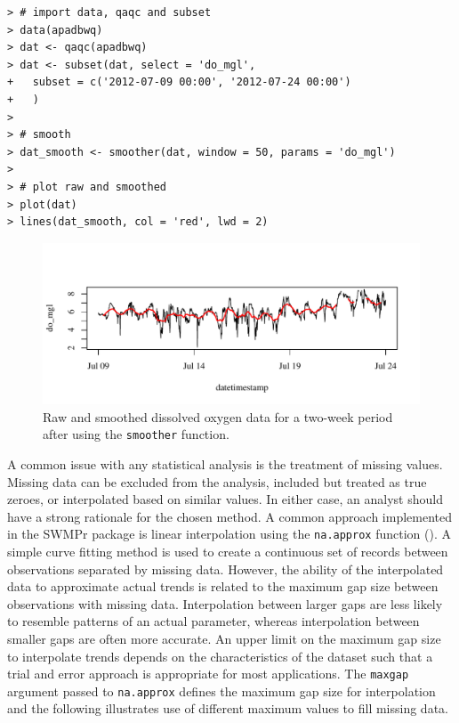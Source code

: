 \documentclass[10pt,letterpaper]{article}\usepackage[]{graphicx}\usepackage[]{color}
\makeatletter
\def\maxwidth{ %
  \ifdim\Gin@nat@width>\linewidth
    \linewidth
  \else
    \Gin@nat@width
  \fi
}
\newenvironment{kframe}{%
 \def\at@end@of@kframe{}%
 \ifinner\ifhmode%
  \def\at@end@of@kframe{\end{minipage}}%
  \begin{minipage}{\columnwidth}%
 \fi\fi%
 \def\FrameCommand##1{\hskip\@totalleftmargin \hskip-\fboxsep
 \colorbox{shadecolor}{##1}\hskip-\fboxsep
     \hskip-\linewidth \hskip-\@totalleftmargin \hskip\columnwidth}%
 \MakeFramed {\advance\hsize-\width
   \@totalleftmargin\z@ \linewidth\hsize
   \@setminipage}}%
 {\par\unskip\endMakeFramed%
 \at@end@of@kframe}
\newenvironment{knitrout}{}{} %
\makeatother
\begin{document}
\begin{knitrout}\small
{}\color{fgcolor}\begin{kframe}
\begin{verbatim}
> # import data, qaqc and subset
> data(apadbwq)
> dat <- qaqc(apadbwq)
> dat <- subset(dat, select = 'do_mgl', 
+   subset = c('2012-07-09 00:00', '2012-07-24 00:00')
+   )
> 
> # smooth
> dat_smooth <- smoother(dat, window = 50, params = 'do_mgl')
> 
> # plot raw and smoothed
> plot(dat)
> lines(dat_smooth, col = 'red', lwd = 2)
\end{verbatim}
\end{kframe}\begin{figure}[!ht]


{\centering \includegraphics[width=\maxwidth]{figure/smooth_ex} 

}

\caption[Raw and smoothed dissolved oxygen data for a two-week period after using the \texttt{smoother} function]{Raw and smoothed dissolved oxygen data for a two-week period after using the \texttt{smoother} function.\label{fig:smooth_ex}}
\end{figure}


\end{knitrout}

A common issue with any statistical analysis is the treatment of missing values.  Missing data can be excluded from the analysis, included but treated as true zeroes, or interpolated based on similar values.  In either case, an analyst should have a strong rationale for the chosen method.  A common approach implemented in the SWMPr package is linear interpolation using the \texttt{na.approx} function ().  A simple curve fitting method is used to create a continuous set of records between observations separated by missing data.  However, the ability of the interpolated data to approximate actual trends is related to the maximum gap size between observations with missing data.  Interpolation between larger gaps are less likely to resemble patterns of an actual parameter, whereas interpolation between smaller gaps are often more accurate.  An upper limit on the maximum gap size to interpolate trends depends on the characteristics of the dataset such that a trial and error approach is appropriate for most applications.  The \texttt{maxgap} argument passed to \texttt{na.approx} defines the maximum gap size for interpolation and the following illustrates use of different maximum values to fill missing data.  
\end{document}
